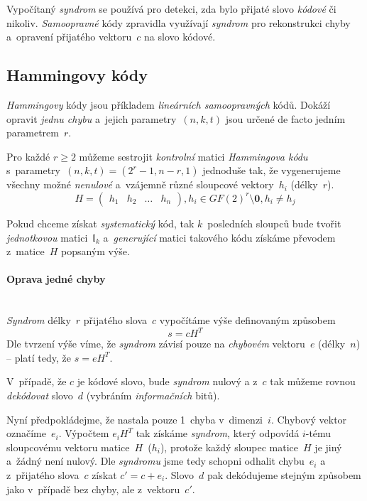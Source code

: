 \documentclass[thesis=M,czech,hidelinks]{FITthesis}[2012/06/26]
\newcommand{\0}{{\textcolor[gray]{0.75}{0}}}
\begin{document}
Vypočítaný \emph{syndrom} se používá pro detekci, zda bylo přijaté slovo
\emph{kódové} či nikoliv. \emph{Samoopravné} kódy zpravidla využívají
\emph{syndrom} pro rekonstrukci chyby a~opravení přijatého vektoru~$c$ na slovo
kódové.


\subsection{Hammingovy kódy}\label{app_hammingovy_kody}

\emph{Hammingovy} kódy jsou příkladem \emph{lineárních samoopravných} kódů.
Dokáží opravit \emph{jednu chybu} a~jejich parametry~$(n,k,t)$ jsou určené de
facto jedním parametrem~$r$.

Pro každé $r \geq 2$ můžeme sestrojit \emph{kontrolní} matici \emph{Hammingova
kódu} s~parametry~$(n,k,t) = (2^r-1,n-r,1)$ jednoduše tak, že vygenerujeme
všechny možné \emph{nenulové} a~vzájemně různé sloupcové vektory~$h_i$
(délky~$r$).
$$
    H = \left(
    \begin{array}{*{4}{c}}
        h_1 & h_2 & \ldots & h_n
    \end{array}
    \right), h_i \in GF(2)^r \setminus \textbf{0}, h_i \neq h_j
$$

Pokud chceme získat \emph{systematický} kód, tak $k$~posledních sloupců bude
tvořit \emph{jednotkovou} matici~$\mathbb{I}_k$ a~\emph{generující} matici
takového kódu získáme převodem z~matice~$H$ popsaným výše.


\paragraph{Oprava jedné chyby} \hfill \\
\emph{Syndrom} délky~$r$ přijatého slova~$c$ vypočítáme výše definovaným
způsobem
$$ s = cH^T $$
Dle tvrzení výše víme, že \emph{syndrom} závisí pouze na \emph{chybovém}
vektoru~$e$ (dél\-ky~$n$) -- platí tedy, že $s = e H^T$.

V~případě, že $c$ je kódové slovo, bude \emph{syndrom} nulový a z~$c$ tak můžeme
rovnou \emph{dekódovat} slovo~$d$ (vybráním \emph{informačních} bitů).

Nyní předpokládejme, že nastala pouze 1~chyba v~dimenzi~$i$. Chybový vektor
označíme~$e_i$. Výpočtem $e_i H^T$ tak získáme \emph{syndrom}, který odpovídá
$i$-tému sloupcovému vektoru matice~$H$~($h_i$), protože každý sloupec
matice~$H$ je jiný a~žádný není nulový. Dle \emph{syndromu} jsme tedy schopni
odhalit chybu~$e_i$ a z~přijatého slova~$c$ získat $c' = c + e_i$. Slovo~$d$ pak
dekódujeme stejným způsobem jako v~případě bez chyby, ale z~vektoru~$c'$.
\end{document}
